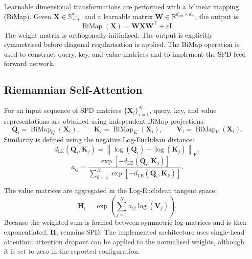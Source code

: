 Learnable dimensional transformations are performed with a bilinear mapping
(BiMap). Given $\bm{X}\in\mathbb{S}_{++}^{d_{\mathrm{in}}}$ and a learnable
matrix
$\bm{W}\in\mathbb{R}^{d_{\mathrm{out}}\times d_{\mathrm{in}}}$, the output is
\begin{equation}
    \operatorname{BiMap}(\bm{X})
    =
    \bm{W}\bm{X}\bm{W}^{\top}
    + \varepsilon\bm{I}.
    \label{eq:bimap}
\end{equation}
The weight matrix is orthogonally initialised. The output is explicitly
symmetrised before diagonal regularisation is applied. The BiMap operation is
used to construct query, key, and value matrices and to implement the SPD
feed-forward network.

\subsection{Riemannian Self-Attention}

For an input sequence of SPD matrices $\{\bm{X}_i\}_{i=1}^{N}$, query, key,
and value representations are obtained using independent BiMap projections:
\begin{equation}
    \bm{Q}_i = \operatorname{BiMap}_{Q}(\bm{X}_i),\qquad
    \bm{K}_i = \operatorname{BiMap}_{K}(\bm{X}_i),\qquad
    \bm{V}_i = \operatorname{BiMap}_{V}(\bm{X}_i).
\end{equation}
Similarity is defined using the negative Log-Euclidean distance:
\begin{equation}
    d_{\mathrm{LE}}(\bm{Q}_i,\bm{K}_j)
    =
    \left\|
        \log(\bm{Q}_i)-\log(\bm{K}_j)
    \right\|_{\mathrm{F}},
\end{equation}
\begin{equation}
    a_{ij}
    =
    \frac{
        \exp\left[-d_{\mathrm{LE}}(\bm{Q}_i,\bm{K}_j)\right]
    }{
        \sum_{k=1}^{N}
        \exp\left[-d_{\mathrm{LE}}(\bm{Q}_i,\bm{K}_k)\right]
    }.
\end{equation}

The value matrices are aggregated in the Log-Euclidean tangent space:
\begin{equation}
    \bm{H}_i
    =
    \exp\left(
        \sum_{j=1}^{N}a_{ij}\log(\bm{V}_j)
    \right).
    \label{eq:spd-attention}
\end{equation}
Because the weighted sum is formed between symmetric log-matrices and is then
exponentiated, $\bm{H}_i$ remains SPD. The implemented architecture uses
single-head attention; attention dropout can be applied to the normalised
weights, although it is set to zero in the reported configuration.

